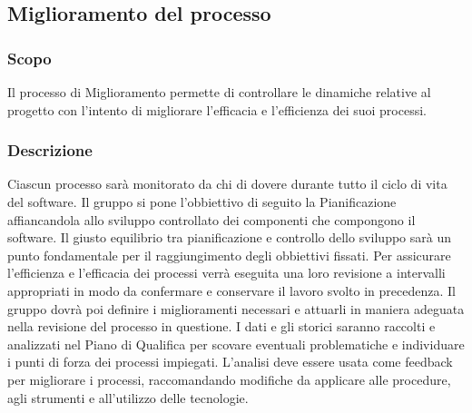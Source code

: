 \subsection{Miglioramento del processo}
\subsubsection{Scopo}
Il processo di Miglioramento permette di controllare le dinamiche relative al progetto con l'intento di migliorare l'efficacia e l'efficienza dei suoi processi.
\subsubsection{Descrizione}
Ciascun processo sarà monitorato da chi di dovere durante tutto il ciclo di vita del software. Il gruppo si pone l'obbiettivo di seguito la Pianificazione affiancandola allo sviluppo controllato dei componenti che compongono il software. Il giusto equilibrio tra pianificazione e controllo dello sviluppo sarà un punto fondamentale per il raggiungimento degli obbiettivi fissati. Per assicurare l'efficienza e l'efficacia dei processi verrà eseguita una loro revisione a intervalli appropriati in modo da confermare e conservare il lavoro svolto in precedenza. Il gruppo dovrà poi definire i miglioramenti necessari e attuarli in maniera adeguata nella revisione del processo in questione. I dati e gli storici saranno raccolti e analizzati nel Piano di Qualifica per scovare eventuali problematiche e individuare i punti di forza dei processi impiegati. L'analisi deve essere usata come feedback per migliorare i processi, raccomandando modifiche da applicare alle procedure, agli strumenti e all'utilizzo delle tecnologie.
